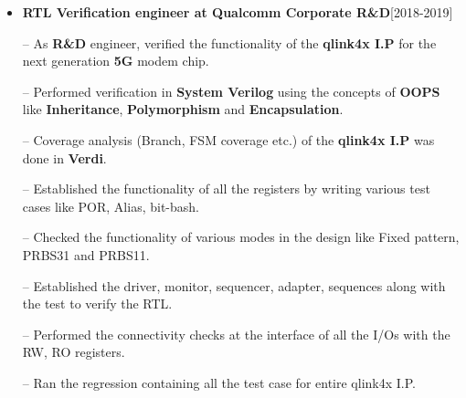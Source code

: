 \documentclass{article}
\begin{document}
\begin{itemize}
\setlength{\itemsep} {-0.2em}
\item \textbf{RTL Verification engineer at Qualcomm Corporate R\&D}\hfill{[2018-2019]}

\item[--] As \textbf{R\&D} engineer, verified the functionality of the \textbf{ qlink4x I.P} for the next generation \textbf{5G} modem chip.
\item [--] Performed verification  in \textbf{System Verilog} using the concepts of \textbf{OOPS} like \textbf{Inheritance}, \textbf{Polymorphism} and \textbf{Encapsulation}.
\item[--] Coverage analysis (Branch, FSM coverage etc.) of the \textbf{qlink4x I.P} was done in \textbf{Verdi}.
\item[--] Established the functionality of all the registers by writing  various test cases like POR, Alias, bit-bash.
\item[--] Checked the functionality of various modes in the design like Fixed pattern, PRBS31 and PRBS11.
\item[--] Established the driver, monitor, sequencer, adapter, sequences  along with the test to verify the RTL.
\item[--]Performed the connectivity checks at the interface of all the I/Os with the RW, RO registers.
\item[--]Ran the regression containing all the test case for entire qlink4x I.P.


\end{itemize}
\end{document}
